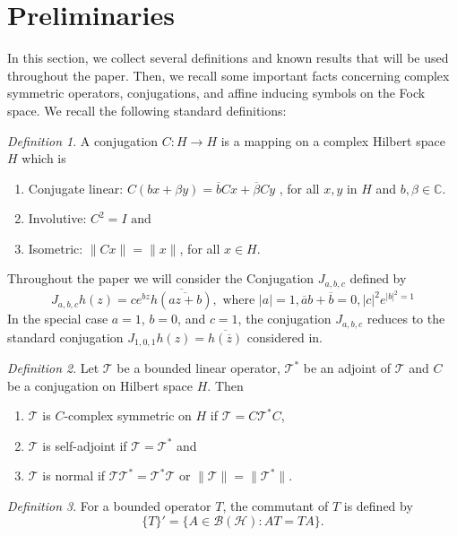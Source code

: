 \documentclass[reqno]{amsart}
\theoremstyle{remark}
\newtheorem{Definition}{Definition}
\theoremstyle{Definition}
\theoremstyle{remark}
\numberwithin{equation}{section}
\begin{document}
\section{Preliminaries}
In this section, we collect several definitions and known results that will be used throughout the paper. Then, we recall some important facts concerning complex symmetric operators, conjugations, and affine inducing symbols on the Fock space.
We recall the following standard definitions:
\begin{Definition}
    A conjugation $C: H \longrightarrow H$ is a mapping on a complex Hilbert space $H$ which is
\begin{enumerate}
 \item[{(i)}]  Conjugate linear: $C(b x+\beta y)=\overline{b}C x+\overline{\beta}Cy$ , for all $x,y$ in $H$ and $b, \beta\in \mathbb{C}.$
 \item[{(ii)}] Involutive: $C^{2}=I \text{ and }$
 \item[{(iii)}] Isometric: $\|Cx\|=\|x\|$, for all $x\in H$.
 \end{enumerate}
\end{Definition}
Throughout the paper we will consider the Conjugation $J_{a,b,c}$ defined by
 \begin{equation}
   J_{a,b,c}h(z)=  ce^{bz}\overline{h(\overline{az+b})}, \text{ where } |a|=1, \overline{a}b+\overline{b}=0, |c|^{2}e^{|b|^{2}=1}
 \end{equation}
 In the special case $a=1$, $b=0$, and $c=1$, the conjugation $J_{a,b,c}$ reduces to the standard conjugation
 $J_{1,0,1}h(z)=\overline{h(\overline{z})}$
 considered in\cite{GH}.
 
\begin{Definition} Let $\mathcal{T}$ be a bounded linear operator, $\mathcal{T}^{*}$ be an adjoint of $\mathcal{T}$ and $C$ be a conjugation on Hilbert space $H$. Then 
\begin{enumerate}
    \item[{(i)}]$\mathcal{T}$ is $C$-complex symmetric on $H$ if $\mathcal{T}=C\mathcal{T}^{*}C$,
    \item[{(i)}]$\mathcal{T}$ is self-adjoint if $\mathcal{T}=\mathcal{T}^{*}$ and
    \item[{(i)}]$\mathcal{T}$ is normal if $\mathcal{T} \mathcal{T}^{*}=\mathcal{T}^{*}\mathcal{T}$ or $\|\mathcal{T}\|=\|\mathcal{T}^{*}\|$.  
\end{enumerate}  
\end{Definition}
\begin{Definition}
     For a bounded operator $T$, the commutant of $T$ is defined by
$$
\{T\}'=\{A\in\mathcal{B}(\mathcal{H}):AT=TA\}.
$$
\end{Definition}
\end{document}
